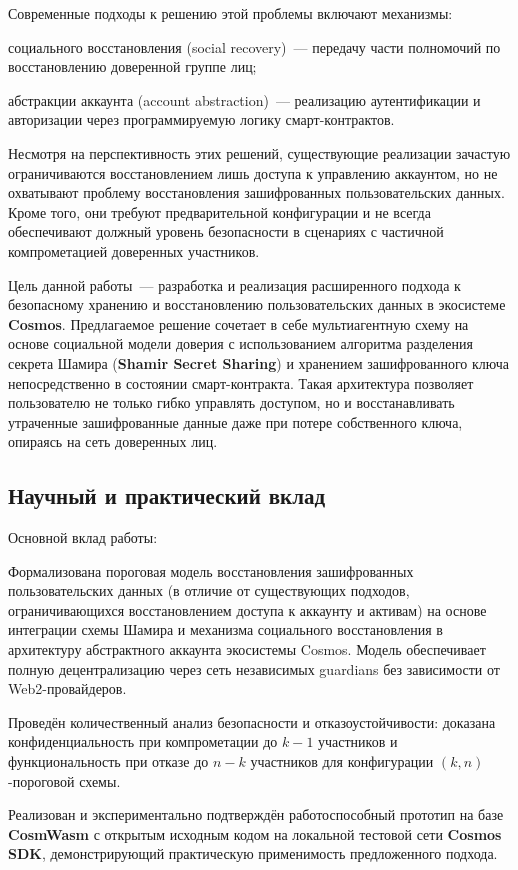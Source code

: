 \documentclass[12pt]{a&t}
\begin{document}
Современные подходы к решению этой проблемы включают механизмы:
\begin{enumlist}
\item
социального восстановления (social recovery)~--- передачу части полномочий по восстановлению доверенной группе лиц;

\item
абстракции аккаунта (account abstraction)~--- реализацию аутентификации и авторизации через программируемую логику смарт-контрактов.
\end{enumlist}

Несмотря на перспективность этих решений, существующие реализации зачастую ограничиваются восстановлением лишь доступа к управлению аккаунтом, но не охватывают проблему восстановления зашифрованных пользовательских данных. Кроме того, они требуют предварительной конфигурации и не всегда обеспечивают должный уровень безопасности в сценариях с частичной компрометацией доверенных участников.

Цель данной работы~--- разработка и реализация расширенного подхода к безопасному хранению и восстановлению пользовательских данных в экосистеме \textbf{Cosmos}. Предлагаемое решение сочетает в себе мультиагентную схему на основе социальной модели доверия с использованием алгоритма разделения секрета Шамира (\textbf{Shamir Secret Sharing}) и хранением зашифрованного ключа непосредственно в состоянии смарт-контракта. Такая архитектура позволяет пользователю не только гибко управлять доступом, но и восстанавливать утраченные зашифрованные данные даже при потере собственного ключа, опираясь на сеть доверенных лиц.

\subsection{Научный и практический вклад}

Основной вклад работы:

\begin{enumlist}
\item
Формализована пороговая модель восстановления зашифрованных пользовательских данных (в отличие от существующих подходов, ограничивающихся восстановлением доступа к аккаунту и активам) на основе интеграции схемы Шамира и механизма социального восстановления в архитектуру абстрактного аккаунта экосистемы Cosmos. Модель обеспечивает полную децентрализацию через сеть независимых guardians без зависимости от Web2-провайдеров.

\item
Проведён количественный анализ безопасности и отказоустойчивости: доказана конфиденциальность при компрометации до $k-1$ участников и функциональность при отказе до $n-k$ участников для конфигурации $(k,n)$-пороговой схемы.

\item
Реализован и экспериментально подтверждён работоспособный прототип на базе \textbf{CosmWasm} с открытым исходным кодом на локальной тестовой сети \textbf{Cosmos SDK}, демонстрирующий практическую применимость предложенного подхода.
\end{enumlist}
\end{document}
